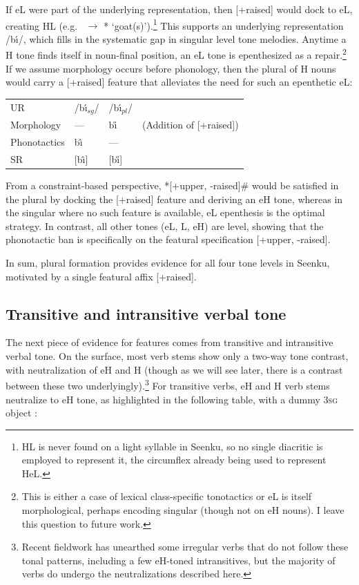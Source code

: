 \documentclass[output=paper]{langsci/langscibook}
\begin{document}
If eL were part of the underlying representation, then [+raised] would dock to eL, creating HL (e.g.\ {\it {}} $\rightarrow$ *{\it {}} `goat(s)').\footnote{HL is never found on a light syllable in Seenku, so no single diacritic is employed to represent it, the circumflex already being used to represent HeL.} This supports an underlying representation /b\'{\i}/, which fills in the systematic gap in singular level tone melodies. Anytime a H tone finds itself in noun-final position, an eL tone is epenthesized as a repair.\footnote{This is either a case of lexical class-specific tonotactics or eL is itself morphological, perhaps encoding singular (though not on eH nouns). I leave this question to future work.} If we assume morphology occurs before phonology, then the plural of H nouns would carry a [+raised] feature that alleviates the need for such an epenthetic eL:

\ea\label{ex:mcpherson:10} \begin{tabular}[t]{llll}
UR & /b\'{\i}$_{sg}$/ & /b\'{\i}$_{pl}$/ & \\
Morphology & --- & b\H{\i} & (Addition of [+raised]) \\
Phonotactics & b\^{\i} & --- & \\
SR & [b\^{\i}] & [b\H{\i}] \\
\end{tabular}
\z 

From a constraint-based perspective, *[+upper, -raised]\# would be satisfied in the plural by docking the [+raised] feature and deriving an eH tone, whereas in the singular where no such feature is available, eL epenthesis is the optimal strategy. In contrast, all other tones (eL, L, eH) are level, showing that the phonotactic ban is specifically on the featural specification [+upper, -raised]. 

In sum, plural formation provides evidence for all four tone levels in Seenku, motivated by a single featural affix [+raised].

\subsection{Transitive and intransitive verbal tone}\label{sec:mcpherson:SecTransitive}

The next piece of evidence for features comes from transitive and intransitive verbal tone. On the surface, most verb stems show only a two-way tone contrast, with neutralization of eH and H (though as we will see later, there is a contrast between these two underlyingly).\footnote{Recent fieldwork has unearthed some irregular verbs that do not follow these tonal patterns, including a few eH-toned intransitives, but the majority of verbs do undergo the neutralizations described here.} For transitive verbs, eH and H verb stems neutralize to eH tone, as highlighted in the following table, with a dummy 3\textsc{sg} object {\it {}}:
\end{document}
